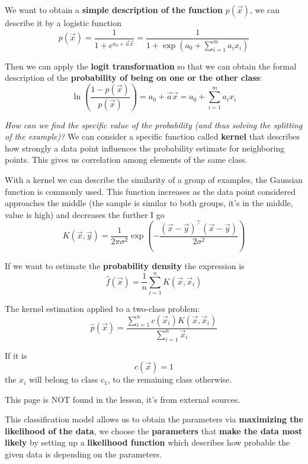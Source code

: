 \documentclass[11pt]{article}
\begin{document}
		We want to obtain a \textbf{simple description of the function} $p(\vec{x})$, we can describe it by a logistic function
		$$ p(\vec{x}) = \frac{1}{1 + e^{a_0 + \vec{a} \vec{x}}} = \frac{1}{1 + \exp \left(a_0 + \sum_{i=1}^m a_i x_i \right)} $$
		
		Then we can apply the \textbf{logit transformation} so that we can obtain the formal description of the \textbf{probability of being on one or the other class}:
		$$ \ln \left(\frac{1 - p(\vec{x})}{p (\vec{x})}\right) = a_0 + \vec{a} \vec{x} = a_0 + \sum_{i=1}^m a_i x_i $$
		
		\textit{How can we find the specific value of the probability (and thus solving the splitting of the example)?} We can consider a specific function called \textbf{kernel} that describes how strongly a data point influences the probability estimate for neighboring points. This gives us correlation among elements of the same class.\\
		
		\newpage
		
		With a kernel we can describe the similarity of a group of examples, the Gaussian function is commonly used. This function increases as the data point considered approaches the middle (the sample is similar to both groups, it's in the middle, value is high) and decreases the further I go
		$$ K (\vec{x}, \vec{y}) = \frac{1}{2 \pi \sigma^2} \exp \left(- \frac{(\vec{x} - \vec{y})^{\top} (\vec{x} - \vec{y})}{2 \sigma^2}\right)$$
		
		If we want to estimate the \textbf{probability density} the expression is
		$$ \hat{f} (\vec{x}) = \frac{1}{n} \sum_{i=1}^n K(\vec{x}, \vec{x}_i)$$
		
		The kernel estimation applied to a two-class problem:
		$$ \hat{p} (\vec{x}) = \frac{\sum_{i=1}^n c(\vec{x}_i) K(\vec{x}, \vec{x}_i)}{\sum_{i=1}^n \vec{x}_i}$$
		
		If it is
		$$ c(\vec{x}) = 1 $$
		the $x_i$ will belong to class $c_1$, to the remaining class otherwise.\\
		
		\vfill
		
		This page is NOT found in the lesson, it's from external sources.
		
		\newpage
		
		This classification model allows us to obtain the parameters via \textbf{maximizing the likelihood of the data}, we choose the \textbf{parameters} that \textbf{make the data most likely} by setting up a \textbf{likelihood function} which describes how probable the given data is depending on the parameters.\\
		
\end{document}
